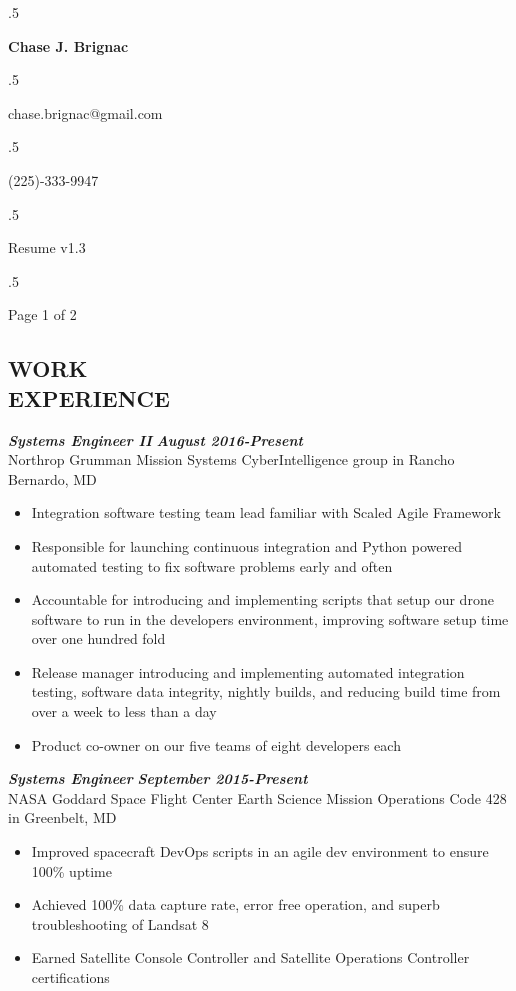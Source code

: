 \documentclass{res}
\begin{document}
 \moveleft.5\hoffset\centerline{\large\bf Chase J. Brignac}
 \moveleft.5\hoffset\centerline{chase.brignac@gmail.com}       
 \moveleft.5\hoffset\centerline{(225)-333-9947}
 \moveleft.5\hoffset\centerline{Resume v1.3}
 \moveleft.5\hoffset\centerline{Page 1 of 2}

\begin{resume}

\section{WORK \\ EXPERIENCE} 


	{\bfseries {\em Systems Engineer II}}  \hfill  {\bfseries{\em August 2016-Present}}\\
		Northrop Grumman Mission Systems CyberIntelligence group in Rancho Bernardo, MD
                \begin{itemize}  \itemsep -2pt
		\item Integration software testing team lead familiar with Scaled Agile Framework
		\item Responsible for launching continuous integration and Python powered automated testing to fix software problems early and often
		\item Accountable for introducing and implementing scripts that setup our drone software to run in the developers environment, improving software setup time over one hundred fold
		\item Release manager introducing and implementing automated integration testing, software data integrity, nightly builds, and reducing build time from over a week to less than a day
		\item Product co-owner on our five teams of eight developers each
                \end{itemize}
                
	{\bfseries {\em Systems Engineer}}  \hfill  {\bfseries{\em September 2015-Present}}\\
		NASA Goddard Space Flight Center Earth Science Mission Operations Code 428 in Greenbelt, MD
                \begin{itemize}  \itemsep -2pt
		\item Improved spacecraft DevOps scripts in an agile dev environment to ensure 100\% uptime
		\item Achieved 100\% data capture rate, error free operation, and superb troubleshooting of Landsat 8
		\item Earned Satellite Console Controller and Satellite Operations Controller certifications
                \end{itemize}
                

\end{resume}
\end{document}
